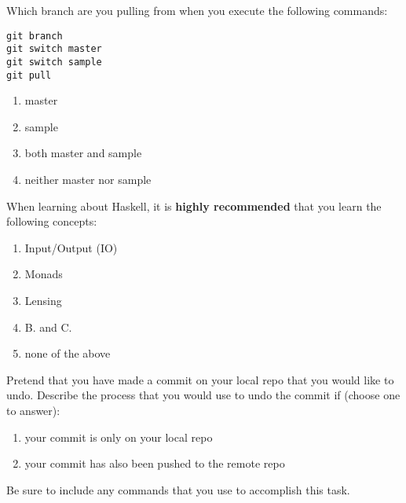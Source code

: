 \documentclass[12pt,fleqn]{examtst}
\begin{document}
\newpage
\noindent
\begin{minipage}{\textwidth}

Which branch are you pulling from when you execute the following commands:

\begin{lstlisting}
git branch
git switch master
git switch sample
git pull
\end{lstlisting}

\begin{enumerate}
    \item master
    \item sample
    \item both master and sample
    \item neither master nor sample
\end{enumerate}
\rule{0cm}{3cm}

When learning about Haskell, it is \textbf{highly recommended} that you learn the following concepts:

\begin{enumerate}
    \item Input/Output (IO)
    \item Monads
    \item Lensing
    \item B. and C.
    \item none of the above
\end{enumerate}
\rule{0cm}{3cm}

\end{minipage}


\newpage
\noindent
\begin{minipage}{\textwidth}

 Pretend that you have made a commit on your local repo that you would like to undo. Describe the process that you would use to undo the commit if (choose one to answer):

\begin{enumerate}
    \item your commit is only on your local repo
    \item your commit has also been pushed to the remote repo
\end{enumerate}

Be sure to include any commands that you use to accomplish this task.

\rule{0cm}{14cm}

\end{minipage}
\end{document}
